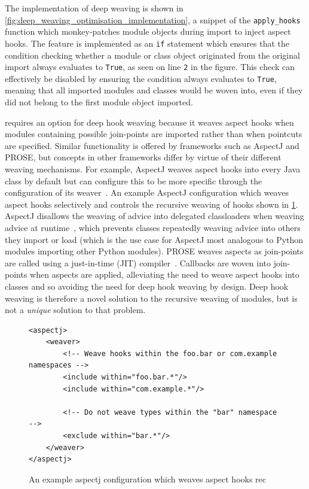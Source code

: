 The implementation of deep weaving is shown in
\cref{fig:deep_weaving_optimisation_implementation}, a snippet of the
\lstinline{apply_hooks} function which monkey-patches module objects during
import to inject aspect hooks. The feature is implemented as an \lstinline{if}
statement which ensures that the condition checking whether a module or class
object originated from the original import always evaluates to \lstinline{True}, as seen
on line \texttt{2} in the figure. This check can effectively be disabled by
ensuring the condition always evaluates to \lstinline{True}, meaning that all
imported modules and classes would be woven into, even if they did not belong to
the first module object imported.

\pdsfthree requires an option for deep hook weaving because it weaves aspect
hooks when modules containing possible join-points are imported rather than when
pointcuts are specified. Similar functionality is offered by \aop frameworks
such as AspectJ and PROSE, but concepts in other frameworks differ by virtue of
their different weaving mechanisms. For example, AspectJ weaves aspect hooks
into every Java class by default but can configure this to be more specific
through the configuration of its weaver~\cite{}. An example AspectJ
configuration which weaves aspect hooks selectively and controls the recursive
weaving of hooks shown in \cref{fig:aspectj_configuration_for_hook_nesting}.
AspectJ disallows the weaving of advice into delegated classloaders when weaving
advice at runtime~\cite{aspectj_ltw_docs}, which prevents classes repeatedly
weaving advice into others they import or load (which is the use case for
AspectJ most analogous to Python modules importing other Python modules). PROSE
weaves aspects as join-points are called using a just-in-time (JIT)
compiler~\cite{dynamicAOPWithProse}. Callbacks are woven into join-points when
aspects are applied, alleviating the need to weave aspect hooks into classes and
so avoiding the need for deep hook weaving by design. Deep hook weaving is
therefore a novel solution to the recursive weaving of modules, but is not a
\emph{unique} solution to that problem.

\begin{figure}
\begin{lstlisting}[style=footnotesize_xml]
<aspectj>
    <weaver>
        <!-- Weave hooks within the foo.bar or com.example namespaces -->
        <include within="foo.bar.*"/>
        <include within="com.example.*"/>

        <!-- Do not weave types within the "bar" namespace -->
        <exclude within="bar.*"/>
    </weaver>
</aspectj>
\end{lstlisting}
\caption{An example aspectj configuration which weaves aspect hooks rec}
\label{fig:aspectj_configuration_for_hook_nesting}
\end{figure}


